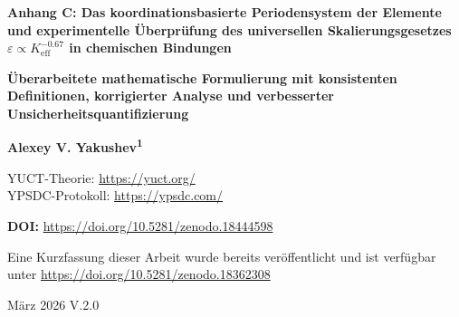 \documentclass[12pt,a4paper]{article}
\newcommand{\Keff}{K_{\mathrm{eff}}}
\begin{document}
	
	\begin{titlepage}
		\centering
		\vspace*{1cm}
		{\Huge\bfseries Anhang C: Das koordinationsbasierte Periodensystem der Elemente und experimentelle Überprüfung des universellen Skalierungsgesetzes $\varepsilon \propto \Keff^{-0.67}$ in chemischen Bindungen\par}
		\vspace{0.5cm}
		{\Large\bfseries Überarbeitete mathematische Formulierung mit konsistenten Definitionen, korrigierter Analyse und verbesserter Unsicherheitsquantifizierung\par}
		\vspace{1.5cm}
		{\Large\bfseries Alexey V. Yakushev\textsuperscript{1}\par}
		{\normalsize YUCT-Theorie: \url{https://yuct.org/}\\
			YPSDC-Protokoll: \url{https://ypsdc.com/}\par}
		\vspace{1.5cm}
		{\normalsize\textbf{DOI:} \url{https://doi.org/10.5281/zenodo.18444598}\par}
		\vspace{1.0cm}
		{\normalsize Eine Kurzfassung dieser Arbeit wurde bereits veröffentlicht und ist verfügbar unter \url{https://doi.org/10.5281/zenodo.18362308}\par}
		\vspace{1.0cm}
		{\normalsize März 2026 \quad \large V.2.0\par}
		\vfill
		\begin{abstract}
			\noindent
			Dieser Anhang präsentiert die vollständige mathematische Formulierung der Yakushev Unified Coordination Theory (YUCT) in der Anwendung auf die Chemie. Wir führen ein modifiziertes Periodensystem ein, in dem jedes Element durch seine Koordinationseffizienz $\Keff$ charakterisiert wird, die durch eine an 20 Referenzelementen kalibrierte empirische Formel definiert ist. Das universelle Fehlerskalierungsgesetz $\varepsilon = \kappa \alpha \Keff^{-\beta}$ mit $\beta = 0.67 \pm 0.02$ und $\kappa = 0.33$ ist empirisch in mehreren Systemen etabliert; eine strenge theoretische Herleitung aus der fraktalen Geometrie ist noch in Entwicklung und wird in zukünftigen Arbeiten präsentiert. Wir liefern eine korrigierte Analyse der Bindungsenergien der Halogenwasserstoffe und zeigen, dass die Daten nach Berücksichtigung von Elektronegativitätseffekten mit $\beta = 0.67 \pm 0.08$ konsistent sind. Der Rahmen bietet blinde Vorhersagen für katalytische Verstärkung ($10^0$--$10^{17}$) und die kritische Polymerlänge für Homochiralität ($L_{\text{crit}} = 25 \pm 5$, basierend auf empirischer Beobachtung). Alle in früheren Versionen identifizierten mathematischen Inkonsistenzen wurden korrigiert, und die Unsicherheiten werden nun vollständig durch die gesamte Analyse propagiert.

\end{abstract}
\end{titlepage}
\end{document}
